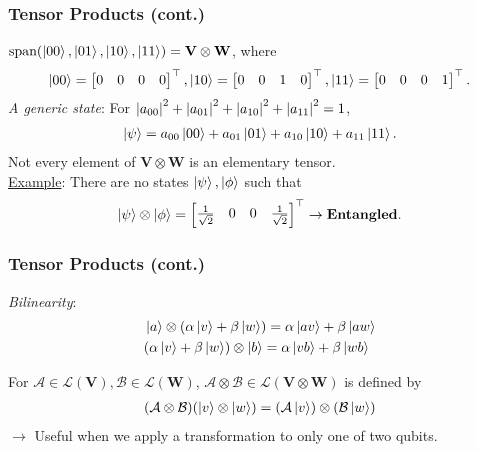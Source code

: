 \documentclass{beamer}
\theoremstyle{definition}
\newcommand{\V}{\mathbf{V}}
\newcommand{\W}{\mathbf{W}}
\newcommand{\A}{\mathcal{A}}
\newcommand{\B}{\mathcal{B}}
\newcommand{\xpan}{\text{span}}
\newcommand{\lag}{\mathcal{L}}
\begin{document}
\begin{frame}
\frametitle{Tensor Products (cont.)}

$\xpan(\ket{00}, \ket{01}, \ket{10}, \ket{11}) = \V\otimes \W$, where
\begin{align*}
\left\vert{00}\right\rangle = \begin{bmatrix}
0&0&0&0
\end{bmatrix}^\top, \left\vert{10}\right\rangle = \begin{bmatrix}
0&0&1&0
\end{bmatrix}^\top, \left\vert{11}\right\rangle = \begin{bmatrix}
0&0&0&1
\end{bmatrix}^\top.
\end{align*}
\textit{A generic state}: For $\abs{a_{00}}^2 + \abs{a_{01}}^2 + \abs{a_{10}}^2 + \abs{a_{11}}^2 = 1$,
\begin{align*}
\left\vert{\psi}\right\rangle = a_{00}\left\vert{00}\right\rangle + a_{01}\left\vert{01}\right\rangle + a_{10}\left\vert{10}\right\rangle + a_{11}\left\vert{11}\right\rangle.
\end{align*}
Not every element of $\V\otimes \W$ is an elementary tensor. \\
$\,$\\
\underline{Example}: There are no states $\left\vert{\psi}\right\rangle, \left\vert{\phi}\right\rangle$ such that
\begin{align*}
\left\vert{\psi}\right\rangle \otimes \left\vert{\phi}\right\rangle = \begin{bmatrix}
\frac{1}{\sqrt{2}} & 0 & 0 & \frac{1}{\sqrt{2}}
\end{bmatrix}^\top \rightarrow \textbf{Entangled}.
\end{align*}

\end{frame}

\begin{frame}
\frametitle{Tensor Products (cont.)}
\textit{Bilinearity}:
\begin{align*}
&\left\vert{a}\right\rangle \otimes (\alpha\left\vert{v}\right\rangle + \beta\left\vert{w}\right\rangle) = \alpha\left\vert{av}\right\rangle + \beta\left\vert{aw}\right\rangle\\
&(\alpha\left\vert{v}\right\rangle + \beta\left\vert{w}\right\rangle) \otimes \left\vert{b}\right\rangle = \alpha\left\vert{vb}\right\rangle + \beta\left\vert{wb}\right\rangle
\end{align*}

For $\A \in \mathfrak{\lag}(\V), \mathcal{B} \in \mathfrak{\lag}(\W)$, $\A\otimes \B \in \mathfrak{\lag}(\V \otimes \W)$ is defined by
\begin{align*}
(\A \otimes \B)(\ket{v}\otimes \ket{w}) = (\A\ket{v})\otimes (\B\ket{w})
\end{align*}
$\rightarrow$ Useful when we apply a transformation to only one of two qubits.
\end{frame}
\end{document}
